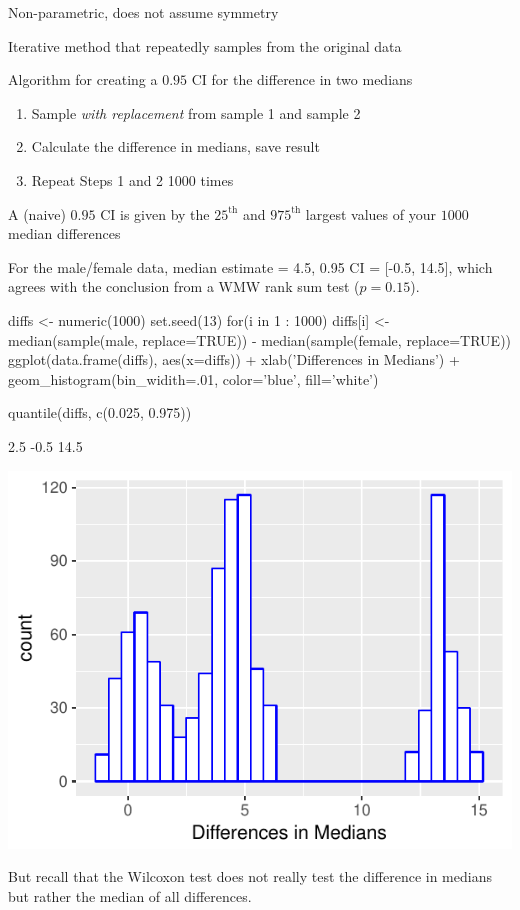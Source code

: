\item Non-parametric, does not assume symmetry
\item Iterative method that repeatedly samples from the original data
\item Algorithm for creating a $0.95$ CI for the difference in two medians
\begin{enumerate}
\item Sample \textit{with replacement} from sample 1 and sample 2
\item Calculate the difference in medians, save result
\item Repeat Steps 1 and 2 1000 times
\end{enumerate}
\item A (naive) $0.95$ CI is given by the $25^\textrm{th}$ and $975^\textrm{th}$ largest values of your $1000$ median differences
\item For the male/female data, median estimate = 4.5, 0.95 CI = [-0.5, 14.5], which agrees with the conclusion from a WMW rank sum test ($p = 0.15$).
\ei
\ei
\begin{Schunk}
\begin{Sinput}
diffs <- numeric(1000)
set.seed(13)
for(i in 1 : 1000) diffs[i] <-
  median(sample(male, replace=TRUE)) - median(sample(female, replace=TRUE))
ggplot(data.frame(diffs), aes(x=diffs)) + xlab('Differences in Medians') +
  geom_histogram(bin_widith=.01, color='blue', fill='white')
\end{Sinput}
\begin{Sinput}
quantile(diffs, c(0.025, 0.975))
\end{Sinput}
\begin{Soutput}
 2.5%
 -0.5  14.5 
\end{Soutput}


\centerline{\includegraphics{nonpar-diffmedboot-1} }

\end{Schunk}
But recall that the Wilcoxon test does not really test the difference
in medians but rather the median of all differences.

